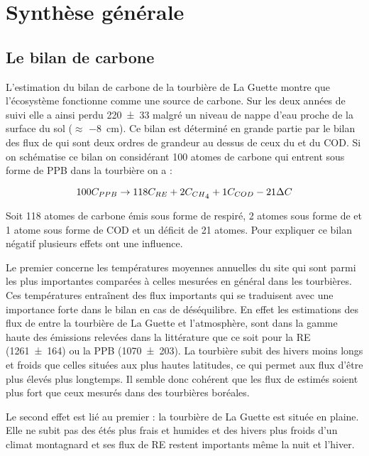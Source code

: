 \section*{Synthèse générale}


\subsection*{Le bilan de carbone}

L'estimation du bilan de carbone de la tourbière de La Guette montre que l'écosystème fonctionne comme une source de carbone.
Sur les deux années de suivi elle a ainsi perdu \SI{220(33)}{\gcma} malgré un niveau de nappe d'eau proche de la surface du sol ($\approx$ \SI{-8}{\centi\metre}).
Ce bilan est déterminé en grande partie par le bilan des flux de \coo qui sont deux ordres de grandeur au dessus de ceux du \chh et du COD.
Si on schématise ce bilan on considérant 100 atomes de carbone qui entrent sous forme de PPB dans la tourbière on a :

\begin{equation}
100C_{PPB} \rightarrow 118C_{RE} + 2C_{CH\textsubscript{4}} + 1C_{COD} -21\Delta C
\end{equation}

Soit 118 atomes de carbone émis sous forme de \coo respiré, 2 atomes sous forme de \chh et 1 atome sous forme de COD et un déficit de 21 atomes.
Pour expliquer ce bilan négatif plusieurs effets ont une influence.

Le premier concerne les températures moyennes annuelles du site qui sont parmi les plus importantes comparées à celles mesurées en général dans les tourbières.
Ces températures entraînent des flux importants qui se traduisent avec une importance forte dans le bilan en cas de déséquilibre.
En effet les estimations des flux de \coo entre la tourbière de La Guette et l'atmosphère, sont dans la gamme haute des émissions relevées dans la littérature que ce soit pour la RE (\SI{1261(164)}{\gcma}) ou la PPB (\SI{1070(203)}{\gcma}).
La tourbière subit des hivers moins longs et froids que celles situées aux plus hautes latitudes, ce qui permet aux flux d'être plus élevés plus longtemps.
Il semble donc cohérent que les flux de \coo estimés soient plus fort que ceux mesurés dans des tourbières boréales.

Le second effet est lié au premier : la tourbière de La Guette est située en plaine. 
Elle ne subit pas des étés plus frais et humides et des hivers plus froids d'un climat montagnard et ses flux de RE restent importants même la nuit et l'hiver.

